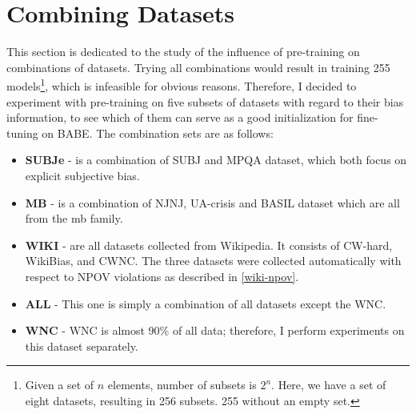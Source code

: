 \section{Combining Datasets}
This section is dedicated to the study of the influence of pre-training on combinations of datasets. Trying all combinations would result in training 255 models\footnote{Given a set of $n$ elements, number of subsets is $2^n$. Here, we have a set of eight datasets, resulting in 256 subsets. 255 without an empty set.}, which is infeasible for obvious reasons. Therefore, I decided to experiment with pre-training on five subsets of datasets with regard to their bias information, to see which of them can serve as a good initialization for fine-tuning on BABE.
The combination sets are as follows:
\begin{itemize}
    \item \textbf{SUBJe} - is a combination of SUBJ and MPQA dataset, which both focus on explicit subjective bias.
    \item \textbf{MB} - is a combination of NJNJ, UA-crisis and BASIL dataset which are all from the \gls{mb} family.
    \item \textbf{WIKI} - are all datasets collected from Wikipedia. It consists of CW-hard, WikiBias, and CWNC. The three datasets were collected automatically with respect to NPOV violations as described in \ref{wiki-npov}.
    \item \textbf{ALL} - This one is simply a combination of all datasets except the WNC.
    \item \textbf{WNC} - WNC is almost 90\% of all data; therefore, I perform experiments on this dataset separately.
\end{itemize}
 
